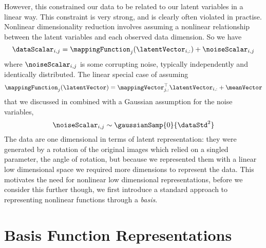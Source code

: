 However, this constrained our data to be related to our latent
variables in a linear way. This constraint is very strong, and is
clearly often violated in practise. Nonlinear dimensionality reduction
involves assuming a nonlinear relationship between the latent
variables and each observed data dimension. So we have
\[
\dataScalar_{i, j} = \mappingFunction_j(\latentVector_{i, :}) +
\noiseScalar_{i, j}
\]
where $\noiseScalar_{i, j}$ is some corrupting noise, typically
independently and identically distributed. The linear special case of
assuming
\[
\mappingFunction_j(\latentVector) = \mappingVector_{j, :}^\top
\latentVector_{i, :} + \meanVector
\]
that we discussed in  combined with a Gaussian
assumption for the noise variables,
\[
\noiseScalar_{i, j} \sim \gaussianSamp{0}{\dataStd^2}
\]
%
%
The data are one dimensional in terms of latent representation: they
were generated by a rotation of the original images which relied on a
singled parameter, the angle of rotation, but because we represented
them with a linear low dimensional space we required more dimensions
to represent the data. This motivates the need for nonlinear low
dimensional representations, before we consider this further though,
we first introduce a standard approach to representing nonlinear
functions through a \emph{\gls{basis}}.

\section{Basis Function Representations}

